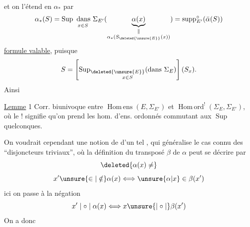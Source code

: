 et on  l'étend en $\alpha_*$ par
\[
\alpha_*(S)=\underset{x\in S}{\operatorname{Sup}\text{ dans }\Sigma_{E'}}
(\underbrace{\alpha(x)}_{\substack{\Vert\\\alpha_*(S_{\deleted{\unsure{E}}}(x))}})
=\operatorname{supp}^{\circ}_{E'}(\bar\alpha(S))
\]
\uline{formule valable}, puisque
\[
S=\left[\underset{x\in S}{\operatorname{Sup}_{\deleted{\unsure{E}}}(\text{dans }\Sigma_E)}\right](S_x).
\]
Ainsi

\uline{Lemme} 1 Corr. biunivoque entre   $\operatorname{Hom\,ens}(E,\Sigma_{E'})$ et $\operatorname{Hom\,ord}^{!}(\Sigma_E,\Sigma_{E'})$, où le $!$ signifie qu'on prend les hom. d'ens. ordonnés commutant aux $\operatorname{Sup}$ quelconques.

On voudrait cependant une notion de  d'un tel , qui généralise le cas connu des ``disjoncteurs triviaux'', où la définition du transposé $\beta$ de $\alpha$ peut se décrire par
\[
\deleted{\alpha(x)\ne}
\]
\[
x'\unsure{\in|\notin}\alpha(x)\Longleftrightarrow\unsure{\alpha|x}\in\beta(x')
\]
ici on passe à la négation
\[
x'\mid\circ\mid\alpha(x)\Longleftrightarrow x\unsure{\mid\circ\mid}\beta(x')
\]
On a donc
